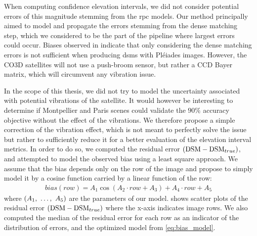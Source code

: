 When computing confidence elevation intervals, we did not consider potential errors of this magnitude stemming from the \acrshort{rpc} models. Our method principally aimed to model and propagate the errors stemming from the dense matching step, which we considered to be the part of the pipeline where largest errors could occur. Biases observed in  indicate that only considering the dense matching errors is not sufficient when producing \acrshort{dsm}s with Pléiades images. However, the CO3D satellites will not use a push-broom sensor, but rather a CCD Bayer matrix, which will circumvent any vibration issue.

In the scope of this thesis, we did not try to model the uncertainty associated with potential vibrations of the satellite. It would however be interesting to determine if Montpellier and Paris scenes could validate the $90\%$ accuracy objective without the effect of the vibrations. We therefore propose a simple correction of the vibration effect, which is not meant to perfectly solve the issue but rather to sufficiently reduce it for a better evaluation of the elevation interval metrics. In order to do so, we computed the residual error $(\mathrm{DSM}-\mathrm{DSM}_{true})$, and attempted to model the observed bias using a least square approach. We assume that the bias depends only on the row of the image and propose to simply model it by a cosine function carried by a linear function of the row:
\begin{align}\label{eq:bias_model}
    bias(row)=A_1\cos(A_2\cdot row+A_3) + A_4\cdot row+A_5
\end{align}
where $(A_1, ~\dots, ~ A_5)$ are the parameters of our model.  shows scatter plots of the residual error $(\mathrm{DSM}-\mathrm{DSM}_{true})$ where the x-axis indicates image rows. We also computed the median of the residual error for each row as an indicator of the distribution of errors, and the optimized model from \cref{eq:bias_model}.

